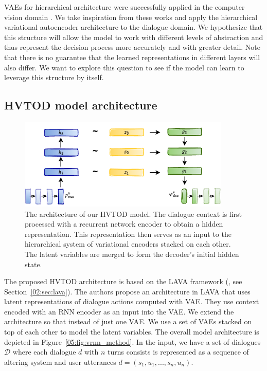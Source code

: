 VAEs for hierarchical architecture were successfully applied in the computer vision domain \cite{vahdat2020nvae,li2020progressive}.
We take inspiration from these works and apply the hierarchical variational autoencoder architecture to the dialogue domain.
We hypothesize that this structure will allow the model to work with different levels of abstraction and thus represent the decision process more accurately and with greater detail.
Note that there is no guarantee that the learned representations in different layers will also differ.
We want to explore this question to see if the model can learn to leverage this structure by itself. 

\subsection{HVTOD model architecture}
\begin{figure}[h]
    \centering
    \includegraphics[width=0.9\textwidth]{images/HVTOD-full-noN.pdf}
    \caption{The architecture of our HVTOD model. The dialogue context is first processed with a recurrent network encoder to obtain a hidden representation. This representation then serves as an input to the hierarchical system of variational encoders stacked on each other. The latent variables are merged to form the decoder's initial hidden state.}
    \label{05:fig:HVTOD-full}
\end{figure}
The proposed HVTOD architecture is based on the LAVA framework (\citealp{lubis-etal-2022-dialogue}, see Section~\ref{02:sec:lava}).
The authors propose an architecture in LAVA that uses latent representations of dialogue actions computed with VAE.
They use context encoded with an RNN encoder as an input into the VAE.
We extend the architecture so that instead of just one VAE.
We use a set of VAEs stacked on top of each other to model the latent variables.
The overall model architecture is depicted in Figure~\ref{05:fig:vrnn_method}.
In the input, we have a set of dialogues $\mathcal{D}$ where each dialogue $d$ with $n$ turns consists is represented as a sequence of altering system and user utterances $d = (s_1,u_1,...,s_n,u_n)$.
